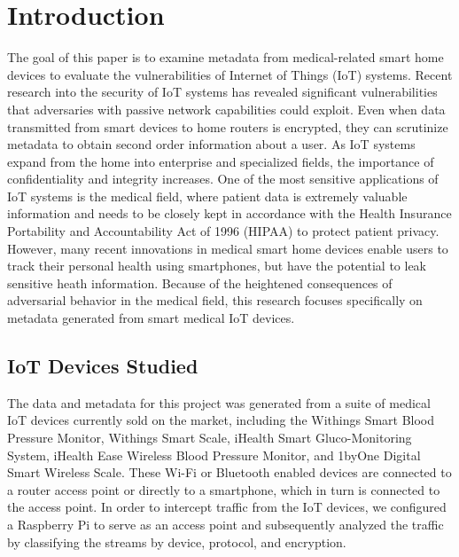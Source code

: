 \section{Introduction}

The goal of this paper is to examine metadata from medical-related smart home devices to evaluate the vulnerabilities of Internet of Things (IoT) systems. Recent research into the security of IoT systems has revealed significant vulnerabilities that adversaries with passive network capabilities could exploit. Even when data transmitted from smart devices to home routers is encrypted, they can scrutinize metadata to obtain second order information about a user. As IoT systems expand from the home into enterprise and specialized fields, the importance of confidentiality and integrity increases. One of the most sensitive applications of IoT systems is the medical field, where patient data is extremely valuable information and needs to be closely kept in accordance with the Health Insurance Portability and Accountability Act of 1996 (HIPAA) to protect patient privacy. However, many recent innovations in medical smart home devices enable users to track their personal health using smartphones, but have the potential to leak sensitive heath information. Because of the heightened consequences of adversarial behavior in the medical field, this research focuses specifically on metadata generated from smart medical IoT devices.

\subsection{IoT Devices Studied}
The data and metadata for this project was generated from a suite of medical IoT devices currently sold on the market, including the Withings Smart Blood Pressure Monitor, Withings Smart Scale, iHealth Smart Gluco-Monitoring System, iHealth Ease Wireless Blood Pressure Monitor, and 1byOne Digital Smart Wireless Scale. These Wi-Fi or Bluetooth enabled devices are connected to a router access point or directly to a smartphone, which in turn is connected to the access point. In order to intercept traffic from the IoT devices, we configured a Raspberry Pi to serve as an access point and subsequently analyzed the traffic by classifying the streams by device, protocol, and encryption. 

